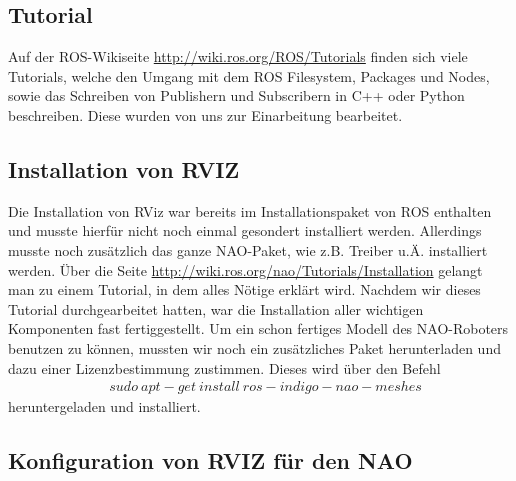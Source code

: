 \documentclass{scrartcl}
\begin{document}
\subsection{Tutorial}

Auf der ROS-Wikiseite
\url{http://wiki.ros.org/ROS/Tutorials} finden sich viele Tutorials, welche den Umgang mit dem ROS Filesystem, Packages und Nodes, sowie das Schreiben von Publishern und Subscribern in C++ oder Python beschreiben.
Diese wurden von uns zur Einarbeitung bearbeitet.

\subsection{Installation von RVIZ}

Die Installation von RViz war bereits im Installationspaket von ROS enthalten und musste hierfür nicht noch einmal gesondert installiert werden. Allerdings musste noch zusätzlich das ganze NAO-Paket, wie z.B. Treiber u.Ä. installiert werden. Über die Seite 
\url{http://wiki.ros.org/nao/Tutorials/Installation}  gelangt man zu einem Tutorial, in dem alles Nötige erklärt wird. Nachdem wir dieses Tutorial durchgearbeitet hatten, war die Installation aller wichtigen Komponenten fast fertiggestellt. Um ein schon fertiges Modell des NAO-Roboters benutzen zu können, mussten wir noch ein zusätzliches Paket herunterladen und dazu einer Lizenzbestimmung zustimmen. Dieses wird über den Befehl
\begin{align}
&sudo\ apt-get\ install\ ros-indigo-nao-meshes
\end{align}
heruntergeladen und installiert.

\subsection{Konfiguration von RVIZ für den NAO}
\end{document}
